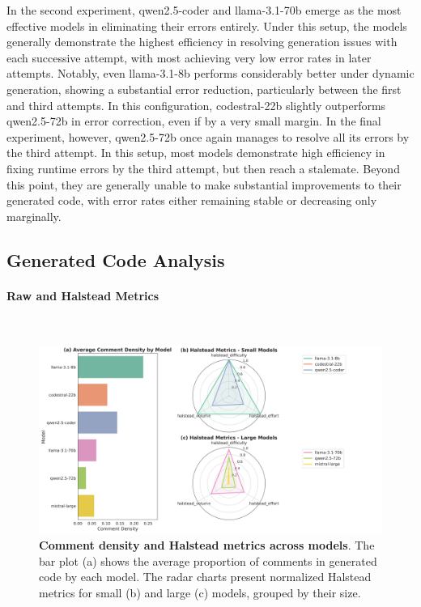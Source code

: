 \documentclass{DESSThesis}
\begin{document}
In the second experiment, qwen2.5-coder and llama-3.1-70b emerge as the most effective models in eliminating their errors entirely. Under this setup, the models generally demonstrate the highest efficiency in resolving generation issues with each successive attempt, with most achieving very low error rates in later attempts. Notably, even llama-3.1-8b performs considerably better under dynamic generation, showing a substantial error reduction, particularly between the first and third attempts. In this configuration, codestral-22b slightly outperforms qwen2.5-72b in error correction, even if by a very small margin. In the final experiment, however, qwen2.5-72b once again manages to resolve all its errors by the third attempt. In this setup, most models demonstrate high efficiency in fixing runtime errors by the third attempt, but then reach a stalemate. Beyond this point, they are generally unable to make substantial improvements to their generated code, with error rates either remaining stable or decreasing only marginally.

\subsection{Generated Code Analysis}

\paragraph{Raw and Halstead Metrics}\mbox{}\\

\begin{figure}[!b]
    \centering
    \includegraphics[width=\linewidth]{img/Results/Second Experimental Phase/Comment_Density_and_Halstead_Radar.png}
    \caption[Comment density and Halstead metrics across models]{\textbf{Comment density and Halstead metrics across models}. The bar plot (a) shows the average proportion of comments in generated code by each model. The radar charts present normalized Halstead metrics for small (b) and large (c) models, grouped by their size.}
    \label{fig:comment_density_and_halstead_second}
\end{figure}
\end{document}
